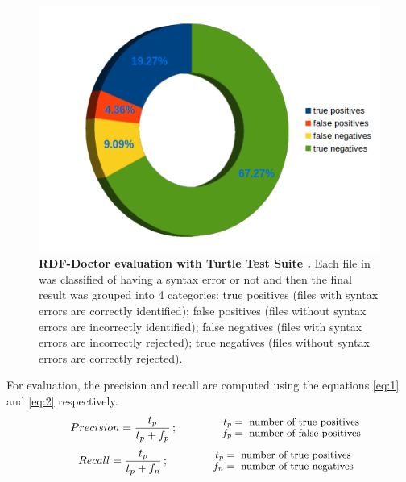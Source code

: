 \begin{figure}[ht]
\begin{center}
		\includegraphics[scale=0.7,angle=0]{images/Experiment01.png}
		\caption{\textbf{RDF-Doctor evaluation with Turtle Test Suite \cite{TurtleTests:Online}.} Each file in \cite{TurtleTests:Online} was classified of having a syntax error or not and then the final result was grouped into 4 categories: true positives (files with syntax errors are correctly identified); false positives (files without syntax errors are incorrectly identified); false negatives (files with syntax errors are incorrectly rejected); true negatives (files without syntax errors are correctly rejected).}
		\label{Fig:Experiment01}
\end{center}
\end{figure}

For evaluation, the precision and recall are computed using the equations \ref{eq:1} and \ref{eq:2} respectively.  
\begin{align} 
   Precision=  \frac{t_p}{t_p+f_p}\,;\qquad
\qquad\parbox{4.0cm}{\footnotesize$\begin{aligned} t_p &= \text{ number of true positives}\\[-1.0ex] f_p &= \text{ number of false positives}\end{aligned}$}
   \label{eq:1}
\end{align}
\begin{align}
   Recall =  \frac{t_p}{t_p+f_n} \,;\qquad
\qquad\parbox{4.0cm}{\footnotesize$\begin{aligned} t_p &= \text{ number of true positives}\\[-1.0ex] f_n &= \text{ number of true negatives}\end{aligned}$}
   \label{eq:2}
\end{align}



